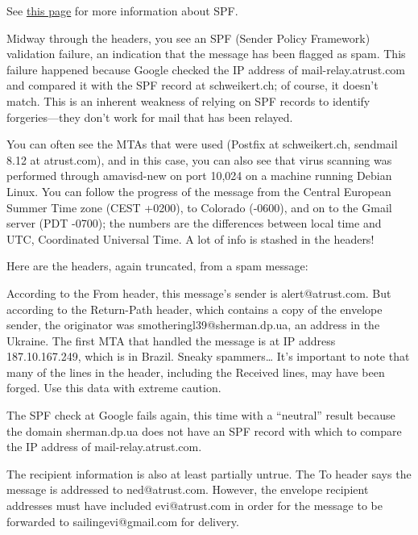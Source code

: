 \leavevmode\hypertarget{part0026_split_008.htmlux5cux23_idContainer1105}{}%
See
\protect\hyperlink{part0026_split_015.htmlux5cux23_idTextAnchor1024}{this
page} for more information about SPF.

Midway through the headers, you see an
\protect\hypertarget{part0026_split_008.htmlux5cux23_idIndexMarker2426}{}{}\protect\hypertarget{part0026_split_008.htmlux5cux23_idIndexMarker2427}{}{}\protect\hypertarget{part0026_split_008.htmlux5cux23_idIndexMarker2428}{}{}SPF
(Sender Policy Framework) validation failure, an indication that the
message has been flagged as spam. This failure happened because Google
checked the IP address of mail-relay.atrust.com and compared it with the
SPF record at {schweikert.ch}; of course, it doesn't match. This is an
inherent weakness of relying on SPF records to identify forgeries---they
don't work for mail that has been relayed.

You can often see the MTAs that were used (Postfix at schweikert.ch,
{sendmail} 8.12 at atrust.com), and in this case, you can also see that
virus scanning was performed through {amavisd-new} on port 10,024 on a
machine running Debian Linux. You can follow the progress of the message
from the Central European Summer Time zone (CEST +0200), to Colorado
(-0600), and on to the Gmail server (PDT -0700); the numbers are the
differences between local time and UTC, Coordinated Universal Time. A
lot of info is stashed in the headers!

Here are the headers, again truncated, from a spam message:


According to the From header, this message's sender is alert@atrust.com.
But according to the Return-Path header, which contains a copy of the
envelope sender, the originator was smotheringl39@sherman.dp.ua, an
address in the Ukraine. The first MTA that handled the message is at IP
address 187.10.167.249, which is in Brazil. Sneaky spammers\ldots{} It's
important to note that many of the lines in the header, including the
Received lines, may have been forged. Use this data with extreme
caution.

The SPF check at Google fails again, this time with a ``neutral'' result
because the domain sherman.dp.ua does not have an SPF record with which
to compare the IP address of mail-relay.atrust.com.

The recipient information is also at least partially untrue. The To
header says the message is addressed to ned@atrust.com. However, the
envelope recipient addresses must have included evi@atrust.com in order
for the message to be forwarded to sailingevi@gmail.com for delivery.


